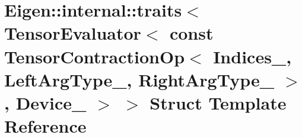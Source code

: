 \hypertarget{struct_eigen_1_1internal_1_1traits_3_01_tensor_evaluator_3_01const_01_tensor_contraction_op_3_01d675ebf024b6201c69018a9924deb8c5}{}\section{Eigen\+:\+:internal\+:\+:traits$<$ Tensor\+Evaluator$<$ const Tensor\+Contraction\+Op$<$ Indices\+\_\+, Left\+Arg\+Type\+\_\+, Right\+Arg\+Type\+\_\+ $>$, Device\+\_\+ $>$ $>$ Struct Template Reference}
\label{struct_eigen_1_1internal_1_1traits_3_01_tensor_evaluator_3_01const_01_tensor_contraction_op_3_01d675ebf024b6201c69018a9924deb8c5}
